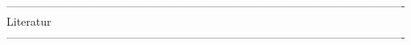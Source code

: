 \documentclass[12pt,a4paper,bibliography=totocnumbered,listof=totocnumbered]{article}
\begin{document}


 ----------------------------------------------------------------------------------------------------------
 Literatur
 ----------------------------------------------------------------------------------------------------------
\lhead{} 

\printbibliography[heading=Literatur,filter=Literatur] 

\pagebreak


\lhead{} 

\printbibliography[title = {Quellenverzeichnis}, heading=Quellen,filter=Quellen] 

\pagebreak 

\setcounter{page}{1}
\end{document}
